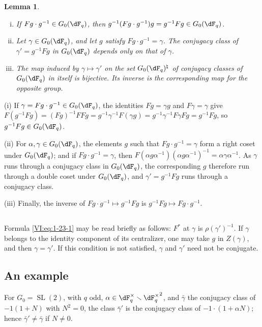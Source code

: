 \documentclass[12pt,oneside,english]{smfbook}
\renewcommand{\setminus}{\smallsetminus}
\newtheorem{lemma_}[subsection]{Lemma}
\begin{document}
\begin{lemma_}\label{VI:1-24}
\begin{enumerate}[(i)]
  \item If $Fg\cdot g^{-1}\in G_0(\dF_q)$, then $g^{-1} (F g\cdot g^{-1}) g = g^{-1} F g\in G_0(\dF_q)$.
  \item Let $\gamma\in G_0(\dF_q)$, and let $g$ satisfy $Fg\cdot g^{-1}=\gamma$. The conjugacy class of $\gamma'=g^{-1}Fg$ in $G_0(\dF_q)$ depends only on that of $\gamma$.
  \item The map induced by $\gamma\mapsto\gamma'$ on the set $G_0(\dF_q)^\natural$ of conjugacy classes of $G_0(\dF_q)$ in itself is bijective. Its inverse is the corresponding map for the opposite group.
\end{enumerate}
\end{lemma_}

(i) If $\gamma=Fg\cdot g^{-1}\in G_0(\dF_q)$, the identities $Fg=\gamma g$ and $F\gamma=\gamma$ give $F(g^{-1}Fg)=(Fg)^{-1}FFg =g^{-1}\gamma^{-1}F(\gamma g) =g^{-1}\gamma^{-1}F\gamma Fg=g^{-1}Fg$, so $g^{-1}Fg\in G_0(\dF_q)$.

(ii) For $\alpha,\gamma\in G_0(\dF_q)$, the elements $g$ such that $Fg\cdot g^{-1}=\gamma$ form a right coset under $G_0(\dF_q)$; and if $Fg\cdot g^{-1}=\gamma$, then $F(\alpha g\alpha^{-1})(\alpha g\alpha^{-1})^{-1} =\alpha\gamma\alpha^{-1}$. As $\gamma$ runs through a conjugacy class in $G_0(\dF_q)$, the corresponding $g$ therefore run through a double coset under $G_0(\dF_q)$, and $\gamma'=g^{-1}Fg$ runs through a conjugacy class.

(iii) Finally, the inverse of $Fg\cdot g^{-1}\mapsto g^{-1}Fg$ is $g^{-1}Fg\mapsto Fg\cdot g^{-1}$.

\subsection{}\label{VI:1-25}

Formula \eqref{VI:eq:1-23-1} may be read briefly as follows: $F^\ast$ at $\gamma$ is $\rho(\gamma')^{-1}$. If $\gamma$ belongs to the identity component of its centralizer, one may take $g$ in $Z(\gamma)$, and then $\gamma=\gamma'$. If this condition is not satisfied, $\gamma$ and $\gamma'$ need not be conjugate.

\subsection{An example}\label{VI:1-26}

For $G_0=\operatorname{SL}(2)$, with $q$ odd, $\alpha\in\dF_q^\times\setminus{\dF_q^\times}^2$, and $\bar\gamma$ the conjugacy class of $-1(1+N)$ with $N^2=0$, the class $\bar\gamma'$ is the conjugacy class of $-1\cdot(1+\alpha N)$; hence $\bar\gamma'\ne\bar\gamma$ if $N\ne0$.
\end{document}
